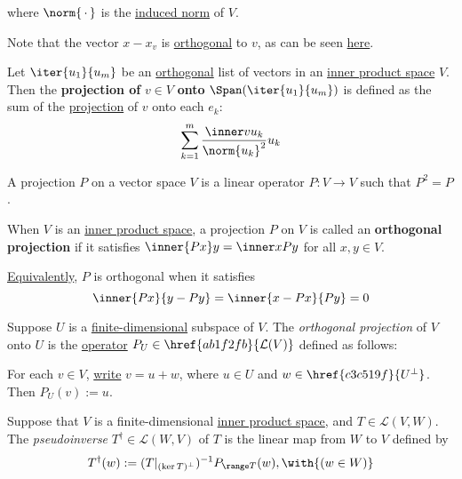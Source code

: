 where $\norm{\,\cdot\,}$ is the \href{d828dac}{induced norm} of $V$.


Note that the vector $x-x_v$ is \href{d9735e5}{orthogonal} to $v$, as can be
seen \href{a7dfcb8}{here}.

\label{e06bd2f}

Let $\iter{u_1}{u_m}$ be an \href{d9735e5}{orthogonal} list of vectors in an
\href{b9935c8}{inner product space} $V$. Then the \textbf{projection of} $v\in
V$ \textbf{onto} $\Span(\iter{u_1}{u_m})$ is defined as the sum of the
\href{fc332ef}{projection} of $v$ onto each $e_k$:
$$
  \sum_{k=1}^m\frac{\inner v{u_k}}{\norm{u_k}^2}u_k
$$

\label{fb705a2}

A projection $P$ on a vector space $V$ is a linear operator $P:V\to V$ such
that $P^2=P$.

When $V$ is an \href{b9935c8}{inner product space}, a projection $P$ on $V$ is
called an \textbf{orthogonal projection} if it satisfies $\inner{Px}y=\inner
x{Py}$ for all $x,y\in V$.

\href{a0d3151}{Equivalently}, $P$ is orthogonal when it satisfies
$$
  \inner{Px}{y-Py}=\inner{x-Px}{Py}=0
$$

%

\label{dbfa2fa}

Suppose $U$ is a \href{c4cd6dd}{finite-dimensional} subspace of $V$. The
\textit{orthogonal projection} of $V$ onto $U$ is the \href{bd31d9c}{operator}
$P_U\in\href{ab1f2fb}{\mathcal L(V)}$ defined as follows:

For each $v\in V$, \href{d7635df}{write} $v=u+w$, where $u\in U$ and $w\in
\href{c3c519f}{U^\perp}$. Then $P_U(v):=u$.

\label{ba879e1}

Suppose that $V$ is a finite-dimensional \href{b9935c8}{inner product space},
and $T\in\mathcal L(V,W)$. The \textit{pseudoinverse} $T^\dagger\in\mathcal
L(W,V)$ of $T$ is the linear map from $W$ to $V$ defined by
$$
  T^\dagger(w):=(T|_{(\ker T)^\perp})^{-1}P_{\range T}(w),\with{(w\in W)}
$$

